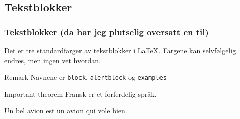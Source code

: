 \begin{frame}
\subsection*{Tekstblokker}
    \frametitle{Tekstblokker (da har jeg plutselig oversatt en til)}
    
    Det er tre standardfarger av tekstblokker i \LaTeX. Fargene kan selvfølgelig endres, men ingen vet hvordan.
    
    \begin{block}{Remark}
    Navnene er \texttt{block}, \texttt{alertblock} og \texttt{examples}
    \end{block}
   
    \begin{alertblock}{Important theorem}
    Fransk er et forferdelig språk.
    \end{alertblock}
    
    \begin{examples}
    Un bel avion est un avion qui vole bien.
    \end{examples}
\end{frame}
%
%    
%    
%
%
